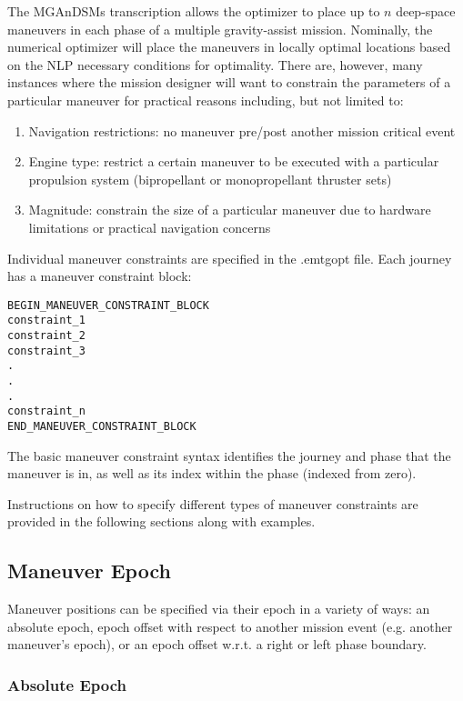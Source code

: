 \documentclass[11pt]{article}
\begin{document}
The \ac{MGAnDSMs} transcription allows the optimizer to place up to $n$ deep-space maneuvers in each phase of a multiple gravity-assist mission. Nominally, the numerical optimizer will place the maneuvers in locally optimal locations based on the \ac{NLP} necessary conditions for optimality. There are, however, many instances where the mission designer will want to constrain the parameters of a particular maneuver for practical reasons including, but not limited to:

\begin{enumerate}
	\item Navigation restrictions: no maneuver pre/post another mission critical event
	\item Engine type: restrict a certain maneuver to be executed with a particular propulsion system (bipropellant or monopropellant thruster sets)
	\item Magnitude: constrain the size of a particular maneuver due to hardware limitations or practical navigation concerns
\end{enumerate}

Individual maneuver constraints are specified in the .emtgopt file. Each journey has a maneuver constraint block:

\begin{verbatim}
BEGIN_MANEUVER_CONSTRAINT_BLOCK
constraint_1
constraint_2
constraint_3
.
.
.
constraint_n
END_MANEUVER_CONSTRAINT_BLOCK
\end{verbatim}

\noindent The basic maneuver constraint syntax identifies the journey and phase that the maneuver is in, as well as its index within the phase (indexed from zero).

\noindent Instructions on how to specify different types of maneuver constraints are provided in the following sections along with examples.

\subsection{Maneuver Epoch}
\label{subsec:MGAnDSMs_constraintEpoch}

Maneuver positions can be specified via their epoch in a variety of ways: an absolute epoch, epoch offset with respect to another mission event (e.g. another maneuver's epoch), or an epoch offset w.r.t. a right or left phase boundary.

\subsubsection{Absolute Epoch}
\end{document}
